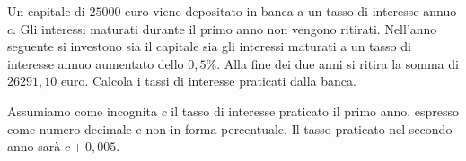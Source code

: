 \begin{problema}{}{}
Un capitale di \(25000\) euro viene depositato in banca a un tasso di 
interesse annuo \(c\). 
Gli interessi maturati durante il primo anno non vengono ritirati.
Nell'anno seguente si investono sia il capitale sia gli interessi maturati 
a un tasso di interesse annuo aumentato dello \(0,5\%\). 
Alla fine dei due anni si ritira la somma di \(26291,10\) euro. 
Calcola i tassi di interesse praticati dalla banca.
\end{problema}
Assumiamo come incognita \(c\) il tasso di interesse praticato il primo 
anno, espresso come numero decimale e non in forma percentuale. 
Il tasso praticato nel secondo anno sarà \(c+0,005\).

